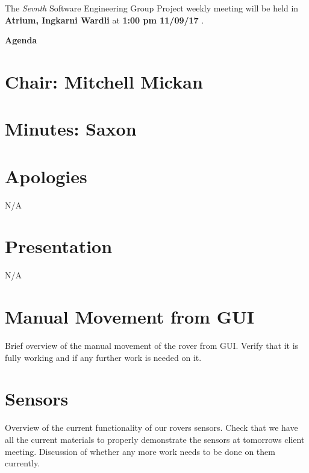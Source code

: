 \documentclass[11pt, a4paper]{article}
\newcommand{\meetingno}{ Sevnth }
\newcommand{\meetinglocation}{ Atrium, Ingkarni Wardli } %
\newcommand{\meetingdatetime}{ 1:00 pm 11/09/17 } %
\newcommand{\meetingchair}{ Mitchell Mickan } %
\newcommand{\meetingminutes}{ Saxon }
\begin{document}
  \noindent The {\em \meetingno} Software Engineering Group Project weekly meeting will be held in {\bf \meetinglocation } at {\bf \meetingdatetime }.

  \vspace*{15pt}

  \begin{center}
  \huge \bf Agenda
  \end{center}

  \section*{Chair: \meetingchair }
  \section*{Minutes: \meetingminutes }
  

  \vspace*{10pt}

  \section{Apologies}
  N/A %

  \section{Presentation}

  N/A	

  
  \section{ Manual Movement from GUI }
  Brief overview of the manual movement of the rover from GUI. Verify that it is fully working and if any further work is needed on it.

  \section{ Sensors }
  Overview of the current functionality of our rovers sensors. Check that we have all the current materials to properly demonstrate the sensors at tomorrows client meeting. Discussion of whether any more work  needs to be done on them currently. 
  
\end{document}
